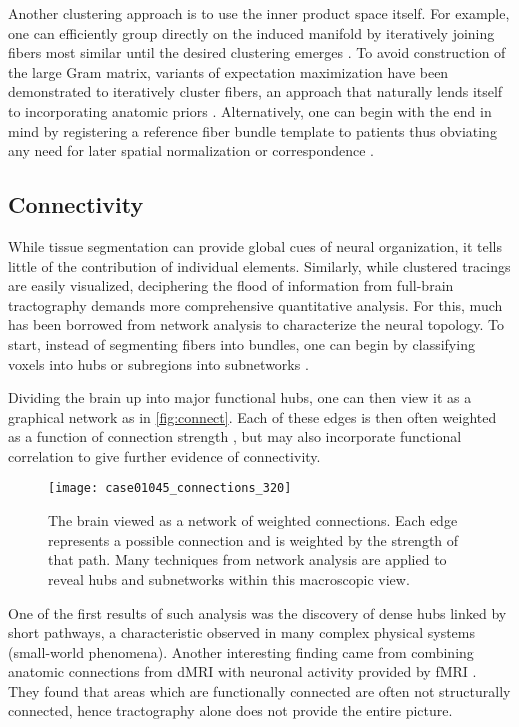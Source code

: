 \documentclass[final,hyperref]{gatech-thesis}
\begin{document}
Another clustering approach is to use the inner product space itself.  For
example, one can efficiently group directly on the induced manifold by
iteratively joining fibers most similar until the desired clustering emerges
\cite{Wasserman2009}.
%
To avoid construction of the large Gram matrix, variants of expectation
maximization have been demonstrated to iteratively cluster fibers, an approach
that naturally lends itself to incorporating anatomic priors
\cite{Wang2009,ODonnell2007tmi,Maddah2008media}.
%
Alternatively, one can begin with the end in mind by registering a reference
fiber bundle template to patients thus obviating any need for later spatial
normalization or correspondence \cite{Clayden2009}.



\subsection{Connectivity}

While tissue segmentation can provide global cues of neural organization, it
tells little of the contribution of individual elements.
%
Similarly, while clustered tracings are easily visualized, deciphering the
flood of information from full-brain tractography demands more comprehensive
quantitative analysis.
%
For this, much has been borrowed from network analysis to characterize the
neural topology.
%
To start, instead of segmenting fibers into bundles, one can begin by
classifying voxels into hubs or subregions into subnetworks
\cite{Sporns2007,Gong2009,Hagmann2007,Hagmann2008}.

Dividing the brain up into major functional hubs, one can then view it as a
graphical network as in \autoref{fig:connect}.  Each of these edges is then
often weighted as a function of connection strength \cite{Hagmann2007}, but
may also incorporate functional correlation to give further evidence of
connectivity.
\begin{figure}[t]
  \centering
  \texttt{[image: case01045\_connections\_320]}
  \caption{The brain viewed as a network of weighted connections.  Each edge
    represents a possible connection and is weighted by the strength of that
    path.  Many techniques from network analysis are applied to reveal hubs
    and subnetworks within this macroscopic view.}
  \label{fig:connect}
\end{figure}

One of the first results of such analysis was the discovery of dense hubs
linked by short pathways, a characteristic observed in many complex physical
systems (small-world phenomena).
%
Another interesting finding came from combining anatomic connections from dMRI
with neuronal activity provided by fMRI \cite{Honey2009}.  They found that
areas which are functionally connected are often not structurally connected,
hence tractography alone does not provide the entire picture.
\end{document}
